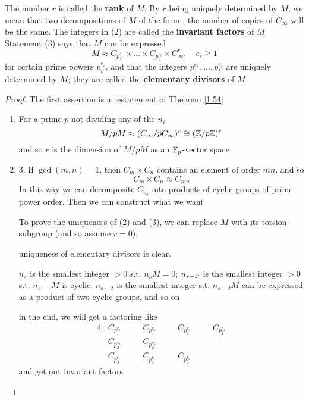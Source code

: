 \documentclass[11pt]{article}
\begin{document}
The number \(r\) is called the \textbf{rank} of \(M\). By \(r\) being uniquely determined by \(M\), we
mean that two decompositions of \(M\) of the form , the number of copies of \(C_\infty\) will be the
same. The integers in (2) are called the \textbf{invariant factors} of \(M\). Statement (3) says
that \(M\) can be expressed
\begin{equation*}
M\approx C_{p_1^{e_1}}\times\dots\times C_{p_t^{e_t}}\times C_\infty^r,\quad e_i\ge 1
\end{equation*}
for certain prime powers \(p_i^{e_i}\), and that the integers \(p_1^{e_1},\dots,p_t^{e_t}\) are uniquely
determined by \(M\); they are called the \textbf{elementary divisors} of \(M\)


\begin{proof}
The first assertion is a restatement of Theorem \ref{1.54}
\begin{enumerate}
\item For a prime \(p\) not dividing any of the \(n_i\)
\begin{equation*}
M/pM\approx(C_\infty/pC_\infty)^r\cong(\mathbb{Z}/p\mathbb{Z})^r
\end{equation*}
and so \(r\) is the dimension of \(M/pM\) as an \(\mathbb{F}_p\)-vector space
\item 3. If \(\gcd(m,n)=1\), then \(C_m\times C_n\) contains an element of order \(mn\), and so
\begin{equation*}
C_m\times C_n\approx C_{mn}
\end{equation*}
In this way we can decomposite \(C_{n_i}\) into products of cyclic groups of prime power order.
Then we can construct what we want

To prove the uniqueness of (2) and (3), we can replace \(M\) with its torsion subgroup (and
so assume \(r=0\)).

uniqueness of elementary divisors is clear.

\(n_s\) is the smallest integer \(>0\) s.t. \(n_sM=0\); \(n_{s-1`}\) is the smallest
integer \(>0\) s.t. \(n_{s-1}M\) is cyclic; \(n_{s-2}\) is the smallest integer
s.t. \(n_{s-2}M\) can be expressed as a product of two cyclic groups, and so on

in the end, we will get a factoring like
\begin{alignat*}{4}
&C_{p_1^{r_1}}\quad&&C_{p_1^{r_2}}\quad&&C_{p_1^{r_3}}\quad&&C_{p_1^{r_4}}\\
&C_{p_2^{s_1}}&&C_{p_2^{s_2}}\\
&C_{p_3^{t_1}}&&C_{p_3^{t_2}}&&C_{p_3^{t_3}}
\end{alignat*}
and get out invariant factors
\end{enumerate}
\end{proof}
\end{document}
